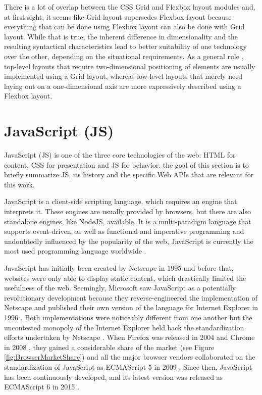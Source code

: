There is a lot of overlap between the CSS Grid and Flexbox layout modules and, at first sight, it seems like Grid layout supersedes Flexbox layout because everything that can be done using Flexbox layout can also be done with Grid layout. While that is true, the inherent difference in dimensionality and the resulting syntactical characteristics lead to better suitability of one technology over the other, depending on the situational requirements. As a general rule \parencite{CSSGridVsFlexbox}, top-level layouts that require two-dimensional positioning of elements are usually implemented using a Grid layout, whereas low-level layouts that merely need laying out on a one-dimensional axis are more expressively described using a Flexbox layout.

\section{JavaScript (JS)}

JavaScript (JS) is one of the three core technologies of the web: HTML for content, CSS for presentation and JS for behavior. the goal of this section is to briefly summarize JS, its history and the specific Web APIs that are relevant for this work.

JavaScript is a client-side scripting language, which requires an engine that interprets it. These engines are usually provided by browsers, but there are also standalone engines, like NodeJS, available. It is a multi-paradigm language that supports event-driven, as well as functional and imperative programming and undoubtedly influenced by the popularity of the web, JavaScript is currently the most used programming language worldwide \parencite{StatisticProgrammingLanguageUsage}.

JavaScript has initially been created by Netscape in 1995 \parencite{JSFirstRelease} and before that, websites were only able to display static content, which drastically limited the usefulness of the web. Seemingly, Microsoft saw JavaScript as a potentially revolutionary development because they reverse-engineered the implementation of Netscape and published their own version of the language for Internet Explorer in 1996 \parencite{JSIERelease}. Both implementations were noticeably different from one another but the uncontested monopoly of the Internet Explorer \parencite{BrowserMarketShareEarly} held back the standardization efforts undertaken by Netscape \parencite{ECMAScript1}. When Firefox was released in 2004 \parencite{FirefoxFirstRelease} and Chrome in 2008 \parencite{ChromeFirstRelease}, they gained a considerable share of the market \parencite{BrowserMarketShare} (see Figure \ref{fig:BrowserMarketShare}) and all the major browser vendors collaborated on the standardization of JavaScript as ECMAScript 5 in 2009 \parencite{ECMAScript5}. Since then, JavaScript has been continuously developed, and its latest version was released as ECMAScript 6 in 2015 \parencite{ECMAScript6}.


